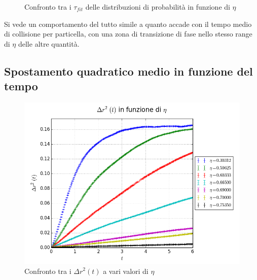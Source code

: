 \begin{center}
\begin{figure}[h]
{	}
	\caption{Confronto tra i $\tau_{fit}$ delle distribuzioni di probabilità in funzione di $\eta$}
	\end{figure}
\end{center}
Si vede un comportamento del tutto simile a quanto accade con il tempo medio di collisione per particella, con una zona di transizione di fase nello stesso range di $\eta$ delle altre quantità.


\newpage
\subsection{Spostamento quadratico medio in funzione del tempo}


\begin{center}
	\begin{figure}[h]
	\centering
		\includegraphics[scale=0.5]{sfere2D/dr2vari.png}
	\caption{Confronto tra i $\Delta r^2(t)$ a vari valori di $\eta$}
	\end{figure}
\end{center}



